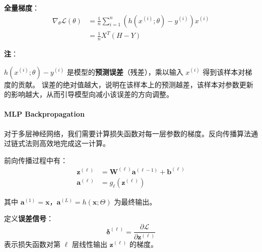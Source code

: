 \textbf{全量梯度}： \[
  \begin{aligned}
    \nabla_\theta \mathcal{L}(\theta)
     & = \frac{1}{n} \sum_{i=1}^n (h(x^{(i)}; \theta) - y^{(i)}) x^{(i)} \\
     & = \frac{1}{n} X^T (H - Y)
  \end{aligned}
\]

\textbf{注}：

\(h(x^{(i)}; \theta) - y^{(i)}\)
是模型的\textbf{预测误差}（残差），乘以输入 \(x^{(i)}\)
得到该样本对梯度的贡献。
误差的绝对值越大，说明在该样本上的预测越差，该样本对参数更新的影响越大，从而引导模型向减小该误差的方向调整。

\paragraph{MLP Backpropagation}\label{mlp-backpropagation}

对于多层神经网络，我们需要计算损失函数对每一层参数的梯度。反向传播算法通过链式法则高效地完成这一计算。

前向传播过程中有： \[
  \begin{aligned}
    \mathbf{z}^{(\ell)} & = \mathbf{W}^{(\ell)} \mathbf{a}^{(\ell-1)} + \mathbf{b}^{(\ell)} \\
    \mathbf{a}^{(\ell)} & = g_\ell(\mathbf{z}^{(\ell)})
  \end{aligned}
\]

其中
\(\mathbf{a}^{(1)} = \mathbf{x}\)，\(\mathbf{a}^{(L)} = h(\mathbf{x}; \Theta)\)
为最终输出。

定义\textbf{误差信号}： \[
  \boldsymbol{\delta}^{(\ell)} = \frac{\partial \mathcal{L}}{\partial \mathbf{z}^{(\ell)}}
\] 表示损失函数对第 \(\ell\) 层线性输出 \(\mathbf{z}^{(\ell)}\) 的梯度。

